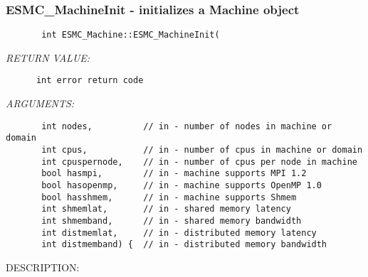  
\parskip        0pt
\parindent      0pt
\baselineskip  11pt
 
\def\bv{\begin{verbatim}}
\def\ev{\end{verbatim}}
\def\be{\begin{equation}}
\def\ee{\end{equation}}
\def\bea{\begin{eqnarray}}
\def\eea{\end{eqnarray}}
\def\bi{\begin{itemize}}
\def\ei{\end{itemize}}
\def\bn{\begin{enumerate}}
\def\en{\end{enumerate}}
\def\bd{\begin{description}}
\def\ed{\end{description}}
\def\({\left (}
\def\){\right )}
\def\[{\left [}
\def\]{\right ]}
\def\<{\left  \langle}
\def\>{\right \rangle}
\def\cI{{\cal I}}
\def\diag{\mathop{\rm diag}}
\def\tr{\mathop{\rm tr}}


 
\subsubsection{ESMC\_MachineInit - initializes a Machine object}


  
\begin{verbatim}       int ESMC_Machine::ESMC_MachineInit(\end{verbatim}{\em RETURN VALUE:}
\begin{verbatim}      int error return code\end{verbatim}{\em ARGUMENTS:}
\begin{verbatim}       int nodes,          // in - number of nodes in machine or domain
       int cpus,           // in - number of cpus in machine or domain
       int cpuspernode,    // in - number of cpus per node in machine
       bool hasmpi,        // in - machine supports MPI 1.2
       bool hasopenmp,     // in - machine supports OpenMP 1.0
       bool hasshmem,      // in - machine supports Shmem
       int shmemlat,       // in - shared memory latency
       int shmemband,      // in - shared memory bandwidth
       int distmemlat,     // in - distributed memory latency
       int distmemband) {  // in - distributed memory bandwidth
       \end{verbatim}
{\sf DESCRIPTION:\\ }


